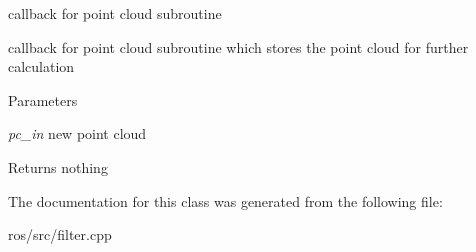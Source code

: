 callback for point cloud subroutine 

callback for point cloud subroutine which stores the point cloud for further calculation


\begin{DoxyParams}{Parameters}
\item[{\em pc\_\-in}]new point cloud\end{DoxyParams}
\begin{DoxyReturn}{Returns}
nothing 
\end{DoxyReturn}


The documentation for this class was generated from the following file:\begin{DoxyCompactItemize}
\item 
ros/src/filter.cpp\end{DoxyCompactItemize}
